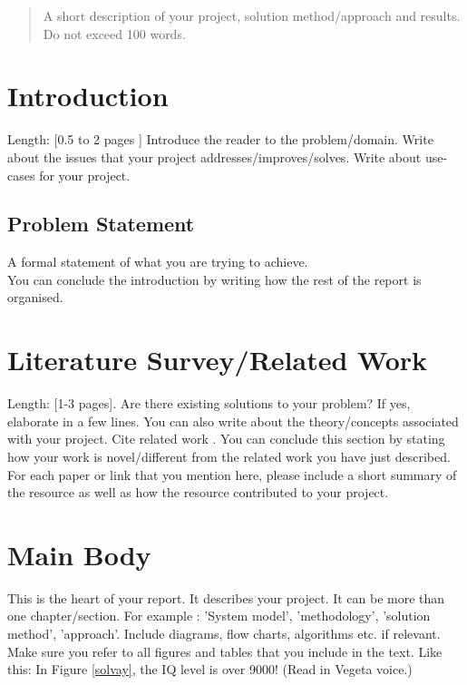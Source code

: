 \documentclass[12pt]{report}
\begin{document}
\begin{abstract}
A short description of your project, solution method/approach and results. Do not exceed 100 words. 
\end{abstract}

\tableofcontents

\chapter{Introduction}
Length: [0.5 to 2 pages ]
Introduce the reader to the problem/domain. Write about the issues that your project addresses/improves/solves. Write about use-cases for your project. 
\section{Problem Statement}
A formal statement of what you are trying to achieve. \\

You can conclude the introduction by writing how the rest of the report is organised.

\chapter{Literature Survey/Related Work} 
Length: [1-3 pages]. 
Are there existing solutions to your problem? If yes, elaborate in a few lines. You can also write about the theory/concepts associated with your project. Cite related work  \cite{wiki:latex}.  You can conclude this section by stating how your work is novel/different from the related work you have just described. For each paper or link that you mention here, please include a short summary of the resource as well as how the resource contributed to your project.

\chapter{Main Body}
This is the heart of your report. It describes your project. It can be more than one chapter/section. For example : 'System model', 'methodology', 'solution method', 'approach'. Include diagrams, flow charts, algorithms etc. if relevant. Make sure you refer to all figures and tables that you include in the text. Like this: In Figure \ref{solvay}, the IQ level is over 9000! (Read in Vegeta voice.)
\end{document}
